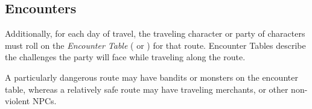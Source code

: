 \newpage


\subsection{Encounters}
Additionally, for each day of travel, the traveling character or party of characters 
must roll on the \textit{Encounter Table} ( or ) for that route. 
Encounter Tables describe the challenges the party will face while traveling along the route.

\begin{Example}
  A particularly dangerous route may have bandits or monsters on the encounter table,
  whereas a relatively safe route may have traveling merchants, or other non-violent NPCs.
\end{Example}




